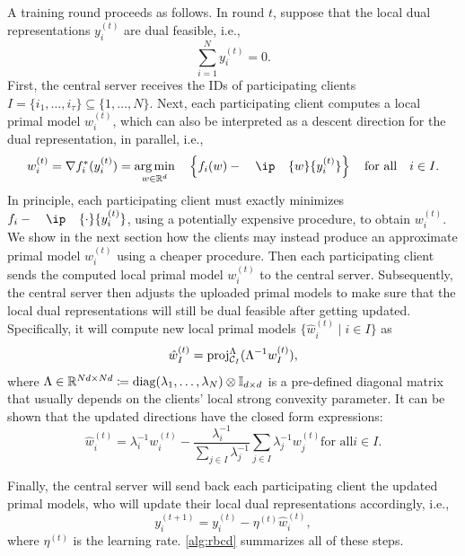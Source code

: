 A training round proceeds as follows. In round $t$, suppose that the local dual representations $y_i^{(t)}$ are dual feasible, i.e., 
\[\sum_{i=1}^N y_i^{(t)} = 0.\]
First, the central server receives the IDs of participating clients $I = \{i_1, \dots, i_\tau\} \subseteq \{1,\dots,N\}$. Next, each participating client computes a local primal model $w_i^{(t)}$, which can also be interpreted as a descent direction for the dual representation, in parallel, i.e., 
\begin{equation} \label{eq:exact_gradient}
    w_i^{(t)} = \nabla f_i^*(y_i^{(t)}) =  \argmin{w \in \Real^d}\enspace \left\{ f_i(w) - \ip{w}{y_i^{(t)}} \right\}  \text{for all} i \in I.
\end{equation}
In principle, each participating client must exactly minimizes $f_i - \ip{\cdot}{y_i^{(t)}}$, using a potentially expensive procedure, to obtain $w_i^{(t)}$. We show in the next section how the clients may instead produce an approximate primal model $w_i^{(t)}$ using a cheaper procedure.
Then each participating client sends the computed local primal model $w_i^{(t)}$ to the central server. Subsequently, the central server then adjusts the uploaded primal models to make sure that the local dual representations will still be dual feasible after getting updated. Specifically, it will compute new local primal models $\{\hat w_i^{(t)} \mid i \in I\}$ as 
\begin{equation} \label{eq:direction_adjust2}
    \hat w_I^{(t)} = \operatorname{proj}_{\mathcal{C}_I}^{\Lambda}(\Lambda^{-1}w_I^{(t)}), 
\end{equation}
where $\Lambda\in\mathbb{R}^{Nd \times Nd} \coloneqq \operatorname{diag}( \lambda_1, \ldots, \lambda_N ) \otimes \mathbb{I}_{d\times d}$ is a pre-defined diagonal matrix that usually depends on the clients' local strong convexity parameter. It can be shown that the updated directions have the closed form expressions:
\begin{equation*} %
    \hat w_i^{(t)} = \lambda_i^{-1}  w_i^{(t)} - \frac{\lambda_i^{-1}}{\sum_{j \in I} \lambda_j^{-1}}\sum_{j \in I} \lambda_j^{-1} w_j^{(t)}  \text{for all} i \in I. 
\end{equation*}

Finally, the central server will send back each participating client the updated primal models, who will update their local dual representations accordingly, i.e.,
\[y_i^{(t+1)} = y_i^{(t)} - \eta^{(t)}\hat w_i^{(t)},\]
where $\eta^{(t)}$ is the learning rate. \autoref{alg:rbcd} summarizes all of these steps.  

